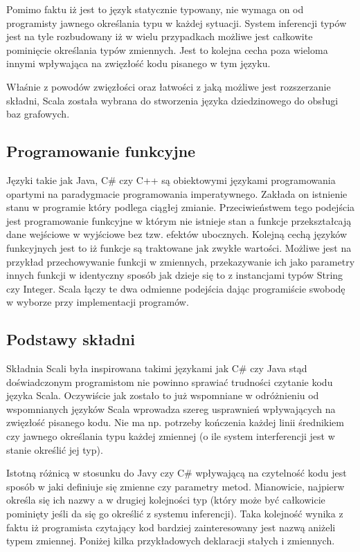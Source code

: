 \documentclass[brudnopis]{xmgr}
\begin{document}
Pomimo faktu iż jest to język statycznie typowany, nie wymaga on od programisty jawnego określania typu w każdej sytuacji. System inferencji typów jest na tyle rozbudowany iż w wielu przypadkach możliwe jest całkowite pominięcie określania typów zmiennych. Jest to kolejna cecha poza wieloma innymi wpływająca na zwięzłość kodu pisanego w tym języku.

Właśnie z powodów zwięzłości oraz łatwości z jaką możliwe jest rozszerzanie składni, Scala została wybrana do stworzenia języka dziedzinowego do obsługi baz grafowych.

\subsection{Programowanie funkcyjne}

Języki takie jak Java, C\# czy C++ są obiektowymi językami programowania opartymi na paradygmacie programowania imperatywnego. Zakłada on istnienie stanu w programie który podlega ciągłej zmianie. Przeciwieństwem tego podejścia jest programowanie funkcyjne w którym nie istnieje stan a funkcje przekształcają dane wejściowe w wyjściowe bez tzw. efektów ubocznych. Kolejną cechą języków funkcyjnych jest to iż funkcje są traktowane jak zwykłe wartości. Możliwe jest na przykład przechowywanie funkcji w zmiennych, przekazywanie ich jako parametry innych funkcji w identyczny sposób jak dzieje się to z instancjami typów String czy Integer. Scala łączy te dwa odmienne podejścia dając programiście swobodę w wyborze przy implementacji programów.

\subsection{Podstawy składni}
Składnia Scali była inspirowana takimi językami jak C\# czy Java stąd doświadczonym programistom nie powinno sprawiać trudności czytanie kodu języka Scala. Oczywiście jak zostało to już wspomniane w odróżnieniu od wspomnianych języków Scala wprowadza szereg usprawnień wpływających na zwięzłość pisanego kodu. Nie ma np. potrzeby kończenia każdej linii średnikiem czy jawnego określania typu każdej zmiennej (o ile system interferencji jest w stanie określić jej typ).

Istotną różnicą w stosunku do Javy czy C\# wpływającą na czytelność kodu jest sposób w jaki definiuje się zmienne czy parametry metod. Mianowicie, najpierw określa się ich nazwy a w drugiej kolejności typ (który może być całkowicie pominięty jeśli da się go określić z systemu inferencji). Taka kolejność wynika z faktu iż programista czytający kod bardziej zainteresowany jest nazwą aniżeli typem zmiennej. Poniżej kilka przykładowych deklaracji stałych i zmiennych.
\end{document}
